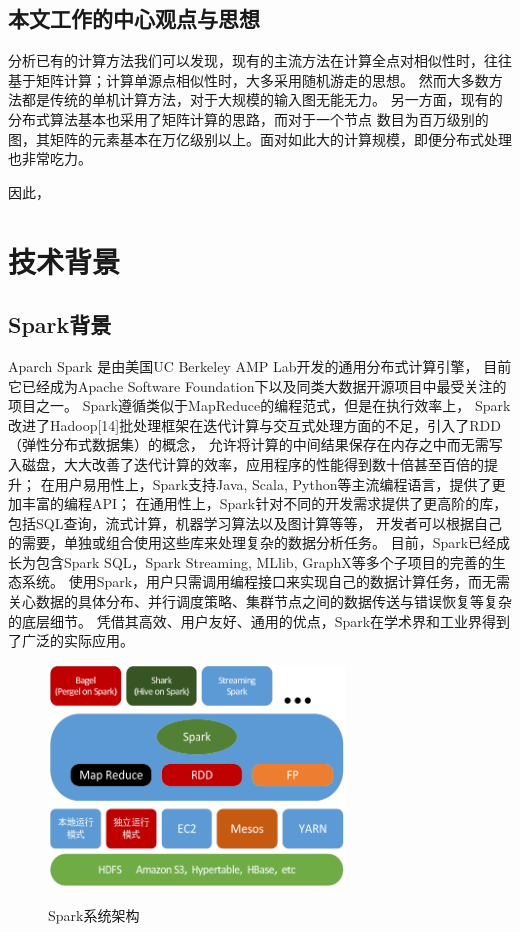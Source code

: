 \documentclass[master]{njuthesis}
\begin{document}
\subsection{本文工作的中心观点与思想}
分析已有的计算方法我们可以发现，现有的主流方法在计算全点对相似性时，往往基于矩阵计算；计算单源点相似性时，大多采用随机游走的思想。
然而大多数方法都是传统的单机计算方法，对于大规模的输入图无能无力。 另一方面，现有的分布式算法基本也采用了矩阵计算的思路，而对于一个节点
数目为百万级别的图，其矩阵的元素基本在万亿级别以上。面对如此大的计算规模，即便分布式处理也非常吃力。

因此，




\section{技术背景}
\subsection{Spark背景}
Aparch Spark 是由美国UC Berkeley AMP Lab开发的通用分布式计算引擎，
目前它已经成为Apache Software Foundation下以及同类大数据开源项目中最受关注的项目之一。
Spark遵循类似于MapReduce的编程范式，但是在执行效率上，
Spark改进了Hadoop[14]批处理框架在迭代计算与交互式处理方面的不足，引入了RDD（弹性分布式数据集）的概念，
允许将计算的中间结果保存在内存之中而无需写入磁盘，大大改善了迭代计算的效率，应用程序的性能得到数十倍甚至百倍的提升；
在用户易用性上，Spark支持Java, Scala, Python等主流编程语言，提供了更加丰富的编程API；
在通用性上，Spark针对不同的开发需求提供了更高阶的库，包括SQL查询，流式计算，机器学习算法以及图计算等等，
开发者可以根据自己的需要，单独或组合使用这些库来处理复杂的数据分析任务。
目前，Spark已经成长为包含Spark SQL，Spark Streaming, MLlib, GraphX等多个子项目的完善的生态系统。
使用Spark，用户只需调用编程接口来实现自己的数据计算任务，而无需关心数据的具体分布、并行调度策略、集群节点之间的数据传送与错误恢复等复杂的底层细节。
凭借其高效、用户友好、通用的优点，Spark在学术界和工业界得到了广泛的实际应用。
\begin{figure}[htbp]
  \centering
  \includegraphics[width= 0.7\textwidth]{figure/spark_stack.png}\\
  \caption{Spark系统架构}\label{fig:spark_stack}
\end{figure}
\end{document}

